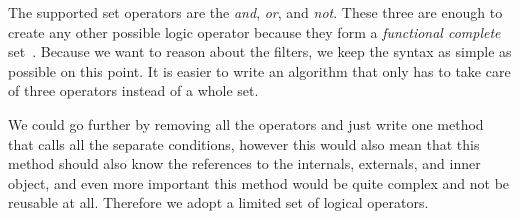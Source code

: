 The supported set operators are the \emph{and}, \emph{or}, and \emph{not}. 
These three are enough to create any other possible logic operator because they form a \emph{functional complete} set~\cite{vanBenthem91}.
Because we want to reason about the filters, we keep the syntax as simple as possible on this point. 
It is easier to write an algorithm that only has to take care of three operators instead of a whole set.

We could go further by removing all the operators and just write one method that calls all the separate conditions, however this would also mean that this method should also know the references to the internals, externals, and inner object, and even more important this method would be quite complex and not be reusable at all. 
Therefore we adopt a limited set of logical operators.

